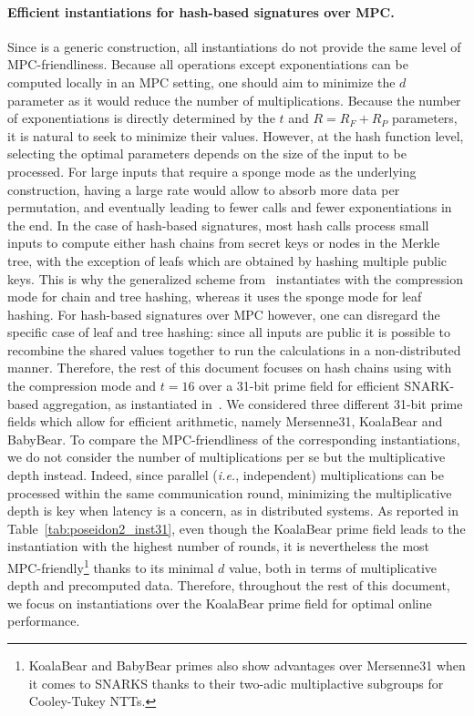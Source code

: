 \paragraph{Efficient instantiations for hash-based signatures over MPC.}
Since \PoseidonTwo is a generic construction, all instantiations do not provide the same level of MPC-friendliness.
Because all operations except exponentiations can be computed locally in an MPC setting, one should aim to minimize the $d$ parameter as it would reduce the number of multiplications.
Because the number of exponentiations is directly determined by the $t$ and $R = R_F + R_P$ parameters, it is natural to seek to minimize their values.
However, at the hash function level, selecting the optimal parameters depends on the size of the input to be processed.
For large inputs that require a sponge mode as the underlying construction, having a large rate would allow to absorb more data per permutation, and eventually leading to fewer calls and fewer exponentiations in the end.
In the case of hash-based signatures, most hash calls process small inputs to compute either hash chains from secret keys or nodes in the Merkle tree, with the exception of leafs which are obtained by hashing multiple public keys.
This is why the generalized \XMSS scheme from~\cite{cryptoeprint:2025/055} instantiates \PoseidonTwo with the compression mode for chain and tree hashing, whereas it uses the sponge mode for leaf hashing.
For hash-based signatures over MPC however, one can disregard the specific case of leaf and tree hashing: since all inputs are public it is possible to recombine the shared values together to run the calculations in a non-distributed manner.
Therefore, the rest of this document focuses on hash chains using \PoseidonTwo with the compression mode and $t = 16$ over a 31-bit prime field for efficient SNARK-based aggregation, as instantiated in~\cite{cryptoeprint:2025/055}.
We considered three different 31-bit prime fields which allow for efficient arithmetic, namely Mersenne31, KoalaBear and BabyBear.
To compare the MPC-friendliness of the corresponding \PoseidonTwo instantiations, we do not consider the number of multiplications per se but the multiplicative depth instead.
Indeed, since parallel (\textit{i.e.}, independent)  multiplications can be processed within the same communication round, minimizing the multiplicative depth is key when latency is a concern, as in distributed systems.
As reported in Table~\ref{tab:poseidon2_inst31}, even though the KoalaBear prime field leads to the instantiation with the highest number of rounds, it is nevertheless the most MPC-friendly\footnote{KoalaBear and BabyBear primes also show advantages over Mersenne31 when it comes to SNARKS thanks to their two-adic multiplactive subgroups for Cooley-Tukey NTTs.} thanks to its minimal $d$ value, both in terms of multiplicative depth and precomputed data.
Therefore, throughout the rest of this document, we focus on instantiations over the KoalaBear prime field for optimal online performance.

